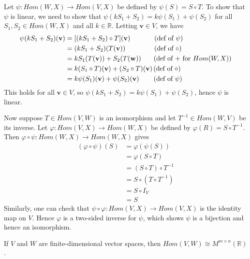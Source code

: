 \documentclass[12pt,letterpaper,reqno]{article}
\numberwithin{equation}{section}
\newcommand{\bv}{\mathbf{v}}
\newcommand{\bw}{\mathbf{w}}
\begin{document}
\begin{pf}
	Let $\psi:Hom(W,X) \to Hom(V,X)$ be defined by $\psi(S)=S \circ T$. To show that $\psi$ is linear, we need to show that $\psi(kS_1+S_2)=k\psi(S_1)+\psi(S_2)$ for all $S_1,S_2 \in Hom(W,X)$ and all $k \in \mathbb{R}$. Letting $\bv \in V$, we have
	\begin{align*}
		\psi(kS_1+S_2)(\bv)&=[(kS_1+S_2)\circ T](\bv) \hspace{1.25cm} \text{(def of $\psi$)}\\
		&=(kS_1+S_2)(T(\bv)) \hspace{1.5cm} \text{(def of $\circ$)}\\
		&=kS_1(T(\bv))+S_2(T(\bw)) \hspace{0.65cm} \text{(def of $+$ for $Hom(W,X)$)}\\
		&=k(S_1 \circ T)(\bv)+(S_2 \circ T)(\bv) \hspace{0.05cm} \text{(def of $\circ$)}\\
		&=k\psi(S_1)(\bv)+\psi(S_2)(\bv) \hspace{0.75cm} \text{(def of $\psi$)}
	\end{align*}
	This holds for all $\bv \in V$, so $\psi(kS_1+S_2)=k\psi(S_1)+\psi(S_2)$, hence $\psi$ is linear. 
	
	Now suppose $T \in Hom(V,W)$ is an isomorphism and let $T^{-1} \in Hom(W,V)$ be its inverse. Let $\varphi: Hom(V,X) \to Hom(W,X)$ be defined by $\varphi(R)=S \circ T^{-1}$. Then $\varphi \circ \psi:Hom(W,X) \to Hom(W,X)$ gives
	\begin{align*}
		(\varphi \circ \psi)(S)&=\varphi(\psi(S)) \\
		&=\varphi(S \circ T) \\
		&=(S \circ T) \circ T^{-1} \\
		&=S \circ (T \circ T^{-1}) \\
		&=S \circ I_V \\
		&=S
	\end{align*}
	Similarly, one can check that $\psi \circ \varphi:Hom(V,X) \to Hom(V,X)$ is the identity map on $V$. Hence $\varphi$ is a two-sided inverse for $\psi$, which shows $\psi$ is a bijection and hence an isomorphism.
\end{pf}

\begin{thm}
	If $V$ and $W$ are finite-dimensional vector spaces, then $Hom(V,W) \cong  M^{m \times n}(\mathbb{R})$.
\end{thm}
\end{document}
